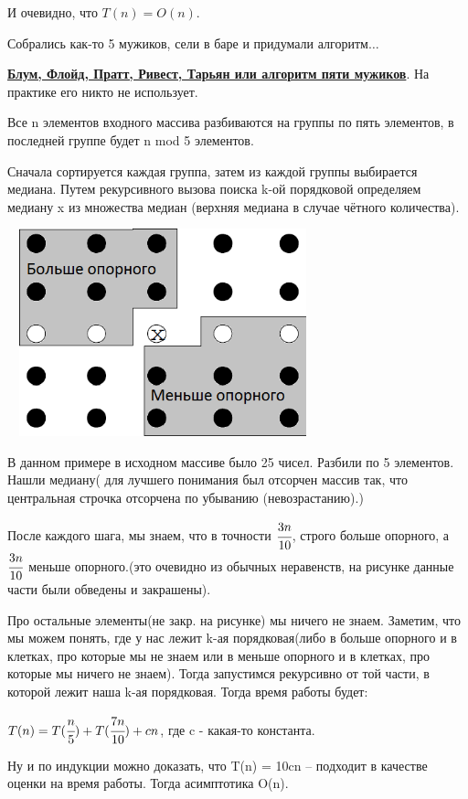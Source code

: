 \documentclass{article}
\newcommand{\deff}[1]{\underline{\textbf{#1}}}
\begin{document}
И очевидно, что $T(n)=O(n)$.

Собрались как-то 5 мужиков, сели в баре и придумали алгоритм$\ldots$

\deff{Блум, Флойд, Пратт, Ривест, Тарьян или алгоритм пяти мужиков}. На практике его никто не использует.

Все n элементов входного массива разбиваются на группы по пять элементов, в последней группе будет n mod 5 элементов.

Сначала сортируется каждая группа, затем из каждой группы выбирается медиана.
Путем рекурсивного вызова поиска k-ой порядковой определяем медиану x
 из множества медиан (верхняя медиана в случае чётного количества).


 \includegraphics[width=9cm, height=6cm]{4.1.png}

 В данном примере в исходном массиве было 25 чисел. Разбили по  5 элементов. Нашли медиану( для лучшего понимания был отсорчен массив так, что центральная строчка отсорчена по убыванию (невозрастанию).)
 
 После каждого шага, мы знаем, что в точности $\cfrac{3n}{10}$, строго больше опорного, а  $\cfrac{3n}{10}$ меньше опорного.(это очевидно из обычных неравенств, на рисунке данные части были обведены и закрашены).

 Про остальные элементы(не закр. на рисунке) мы ничего не знаем. Заметим, что мы можем понять, где у нас лежит k-ая порядковая(либо в больше опорного и в клетках, про которые мы не знаем или в меньше опорного и в клетках, про которые мы ничего не знаем). Тогда запустимся рекурсивно от той части, в которой лежит наша k-ая порядковая. Тогда время работы будет:

$T(n) = T(\cfrac{n}{5}) + T(\cfrac{7n}{10}) +cn $, где c - какая-то константа.

 Ну и по индукции можно доказать, что T(n) = 10cn -- подходит в качестве оценки на время работы. Тогда асимптотика O(n).
\end{document}
